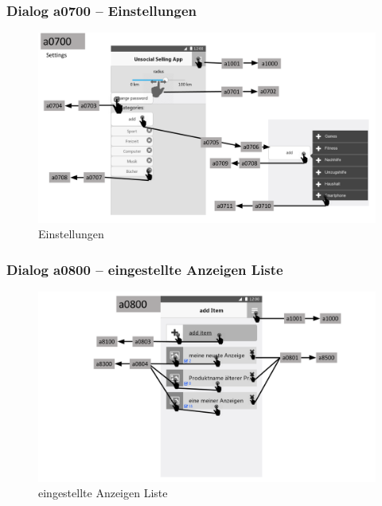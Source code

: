 \documentclass[a4paper,12pt,oneside]{scrartcl}
\begin{document}
\subsubsection{Dialog a0700 – Einstellungen}
\begin{figure}[!htbp]
\centering
\noindent\includegraphics[width=\linewidth,height=\textheight,keepaspectratio]{Dialoge/a0700}
\caption{Einstellungen}
\end{figure}
\FloatBarrier

\subsubsection{Dialog a0800 – eingestellte Anzeigen Liste}
\begin{figure}[!htbp]
\centering
\noindent\includegraphics[width=\linewidth,height=\textheight,keepaspectratio]{Dialoge/a0800}
\caption{eingestellte Anzeigen Liste}
\end{figure}
\FloatBarrier
\end{document}
